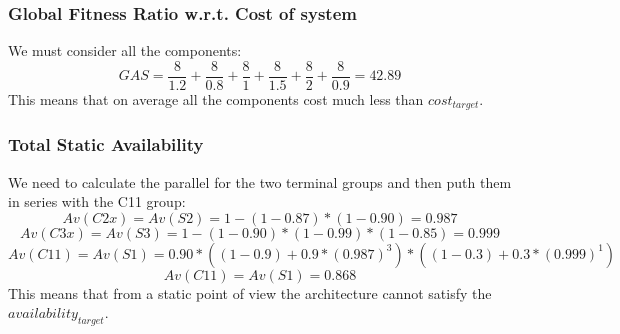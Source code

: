 \subsubsection{Global Fitness Ratio w.r.t. Cost of system}
We must consider all the components:
\[GAS = \frac{8}{1.2} + \frac{8}{0.8} + \frac{8}{1} + \frac{8}{1.5} + \frac{8}{2} + \frac{8}{0.9} = 42.89\]
This means that on average all the components cost much less than \emph{$cost_{target}$}.
\subsubsection{Total Static Availability}
We need to calculate the parallel for the two terminal groups and then puth them in series with the C11 group:
\[Av(C2x) = Av(S2) = 1-(1-0.87)*(1-0.90) = 0.987\]
\[Av(C3x) = Av(S3) = 1-(1-0.90)*(1-0.99)*(1-0.85) = 0.999\]
\[Av(C11) = Av(S1) = 0.90 * ((1-0.9)+0.9*(0.987)^3)*((1-0.3) + 0.3*(0.999)^1)\]
\[Av(C11) = Av(S1) = 0.868\]
This means that from a static point of view the architecture cannot satisfy the \emph{$availability_{target}$}.